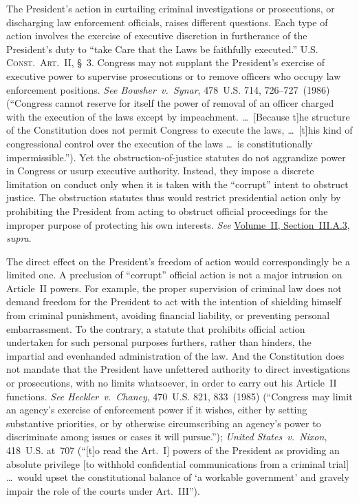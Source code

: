 The President's action in curtailing criminal investigations or prosecutions, or discharging law enforcement officials, raises different questions.
Each type of action involves the exercise of executive discretion in furtherance of the President's duty to ``take Care that the Laws be faithfully executed.''
\textsc{U.S. Const.\ Art.~II}, \S~3.
Congress may not supplant the President's exercise of executive power to supervise prosecutions or to remove officers who occupy law enforcement positions.
\textit{See Bowsher~v.\ Synar}, 478~U.S. 714, 726--727~(1986) (``Congress cannot reserve for itself the power of removal of an officer charged with the execution of the laws except by impeachment. \dots\ [Because t]he structure of the Constitution does not permit Congress to execute the laws, \dots\ [t]his kind of congressional control over the execution of the laws \dots\ is constitutionally impermissible.'').
Yet the obstruction-of-justice statutes do not aggrandize power in Congress or usurp executive authority.
Instead, they impose a discrete limitation on conduct only when it is taken with the ``corrupt'' intent to obstruct justice.
The obstruction statutes thus would restrict presidential action only by prohibiting the President from acting to obstruct official proceedings for the improper purpose of protecting his own interests.
\textit{See} \hyperlink{subsubsection.2.3.1.3}{Volume~II, Section~III.A.3}, \textit{supra}.

The direct effect on the President's freedom of action would correspondingly be a limited one.
A preclusion of ``corrupt'' official action is not a major intrusion on Article~II powers.
For example, the proper supervision of criminal law does not demand freedom for the President to act with the intention of shielding himself from criminal punishment, avoiding financial liability, or preventing personal embarrassment.
To the contrary, a statute that prohibits official action undertaken for such personal purposes furthers, rather than hinders, the impartial and evenhanded administration of the law.
And the Constitution does not mandate that the President have unfettered authority to direct investigations or prosecutions, with no limits whatsoever, in order to carry out his Article~II functions.
\textit{See Heckler~v.\ Chaney}, 470~U.S. 821, 833~(1985) (``Congress may limit an agency's exercise of enforcement power if it wishes, either by setting substantive priorities, or by otherwise circumscribing an agency's power to discriminate among issues or cases it will pursue.'');
\textit{United States~v.\ Nixon}, 418~U.S. at~707 (``[t]o read the Art.~I] powers of the President as providing an absolute privilege [to withhold confidential communications from a criminal trial] \dots\ would upset the constitutional balance of `a workable government' and gravely impair the role of the courts under Art.~III'').

